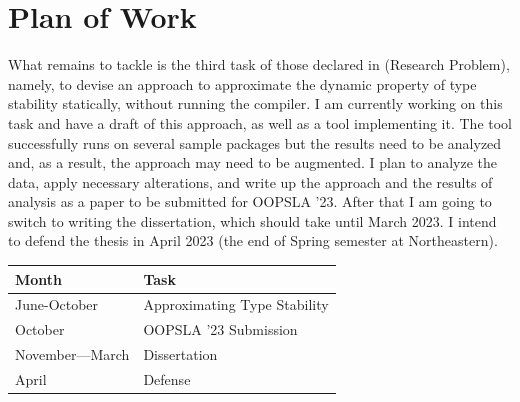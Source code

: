 \documentclass[oneside,openright,titlepage,numbers=noenddot,%
headinclude,footinclude,cleardoublepage=empty,abstract=on,
BCOR=5mm,paper=a4,fontsize=11pt,
dvipsnames
]{scrreprt}
\begin{document}






\chapter{Plan of Work}%
\label{chap-plan}

What remains to tackle is the third task of those declared in
 (Research Problem), namely, to devise an approach to
approximate the dynamic property of type stability statically, without running
the compiler. I am currently working on this task and have a draft of this
approach, as well as a tool implementing it.
The tool successfully runs on several sample packages but the results need to be
analyzed and, as a result, the approach may need to be augmented.
I plan to analyze the data, apply necessary alterations, and
write up the approach and the results of analysis as a paper to be submitted for
OOPSLA '23. After that I am going to switch to writing the dissertation, which
should take until March 2023. I intend to defend the thesis in April 2023 (the
end of Spring semester at Northeastern).

\begin{center}
  \begin{tabular}{ll}
    \toprule
    \textbf{Month} & \textbf{Task} \\
    \midrule
    June-October & Approximating Type Stability\\
    October & OOPSLA '23 Submission\\
    November---March & Dissertation\\
    April & Defense\\
    \bottomrule
  \end{tabular}
\end{center}
\end{document}
